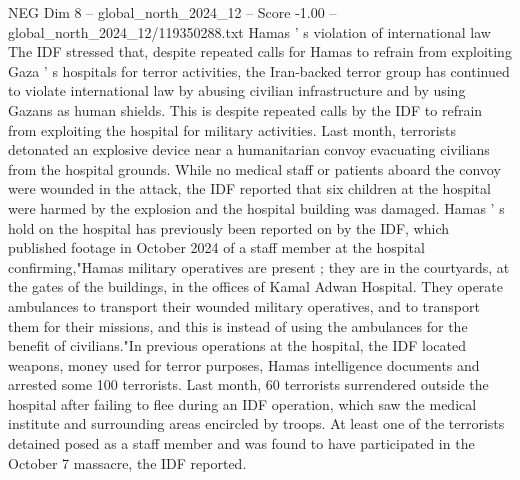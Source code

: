 \begin{textsample}{NEG Dim 8 – global\_north\_2024\_12 – Score -1.00 – global\_north\_2024\_12/119350288.txt}
Hamas ' s violation of international law The IDF stressed that, despite repeated calls for Hamas to refrain from exploiting Gaza ' s hospitals for terror activities, the Iran-backed terror group has continued to violate international law by abusing civilian infrastructure and by using Gazans as human shields.
This is despite repeated calls by the IDF to refrain from exploiting the hospital for military activities.
Last month, terrorists detonated an explosive device near a humanitarian convoy evacuating civilians from the hospital grounds.
While no medical staff or patients aboard the convoy were wounded in the attack, the IDF reported that six children at the hospital were harmed by the explosion and the hospital building was damaged.
Hamas ' s hold on the hospital has previously been reported on by the IDF, which published footage in October 2024 of a staff member at the hospital confirming,"Hamas military operatives are present ; they are in the courtyards, at the gates of the buildings, in the offices of Kamal Adwan Hospital.
They operate ambulances to transport their wounded military operatives, and to transport them for their missions, and this is instead of using the ambulances for the benefit of civilians."In previous operations at the hospital, the IDF located weapons, money used for terror purposes, Hamas intelligence documents and arrested some 100 terrorists.
Last month, 60 terrorists surrendered outside the hospital after failing to flee during an IDF operation, which saw the medical institute and surrounding areas encircled by troops.
At least one of the terrorists detained posed as a staff member and was found to have participated in the October 7 massacre, the IDF reported.

\end{textsample}
